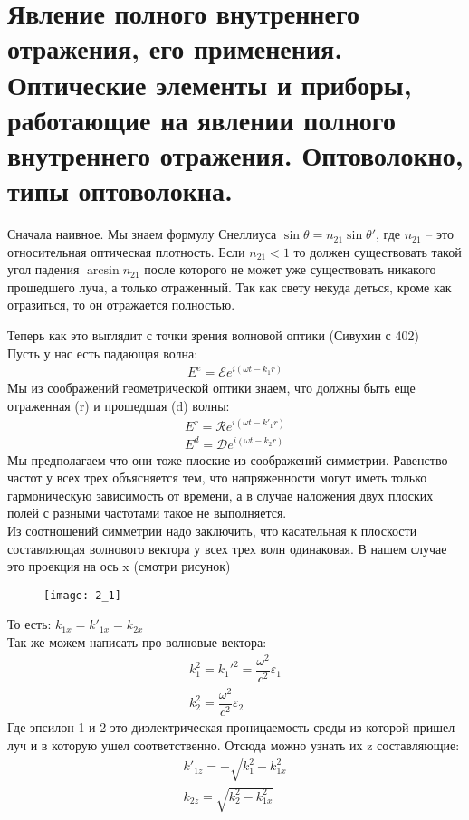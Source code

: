 	\section{Явление полного внутреннего отражения, его применения. Оптические элементы и
		приборы, работающие на явлении полного внутреннего отражения. Оптоволокно,
		типы оптоволокна.}
	Сначала наивное. Мы знаем формулу Снеллиуса $\sin \theta = n_{21} \sin \theta'$, где $n_{21}$ -- это относительная оптическая плотность. Если $n_{21} < 1$ то должен существовать такой угол падения $\arcsin n_{21}$ после которого не может уже существовать никакого прошедшего луча, а только отраженный. Так как свету некуда деться, кроме как отразиться, то он отражается полностью. 
	
	Теперь как это выглядит с точки зрения волновой оптики (Сивухин с 402)\\
	Пусть у нас есть падающая волна:
	\begin{align*}
		E^{e} = \mathcal{E} e^{i(\omega t - k_1 r)}
	\end{align*}
	Мы из соображений геометрической оптики знаем, что должны быть еще отраженная (r) и прошедшая (d) волны:
	\begin{align*}
	E^{r} = \mathcal{R} e^{i(\omega t - k'_1 r)}\\E^{d} = \mathcal{D} e^{i(\omega t - k_2 r)}
	\end{align*}
	Мы предполагаем что они тоже плоские из соображений симметрии. Равенство частот у всех трех объясняется тем, что напряженности могут иметь только гармоническую зависимость от времени, а в случае наложения двух плоских полей с разными частотами такое не выполняется.\\
	Из соотношений симметрии надо заключить, что касательная к плоскости составляющая волнового вектора у всех трех волн одинаковая. В нашем случае это проекция на ось x (смотри рисунок)
	\begin{figure}[H]
		\texttt{[image: 2\_1]}
	\end{figure}
	То есть: $k_{1x} = k'_{1x} = k_{2x}$\\
	Так же можем написать про волновые вектора:
	\begin{align*}
	k_1^2 = k_1'^2 = \dfrac{\omega^2 }{c^2 } \varepsilon_1\\
	k_2^2 = \dfrac{\omega^2 }{c^2 } \varepsilon_2
	\end{align*}
	Где эпсилон 1 и 2 это диэлектрическая проницаемость среды из которой пришел луч и в которую ушел соответственно. Отсюда можно узнать их z составляющие:
	\begin{align*}
	k'_{1z} = - \sqrt{k_1^2 - k_{1x}^2}\\
	k_{2z} = \sqrt{k_2^2 - k_{1x}^2}	
	\end{align*}
